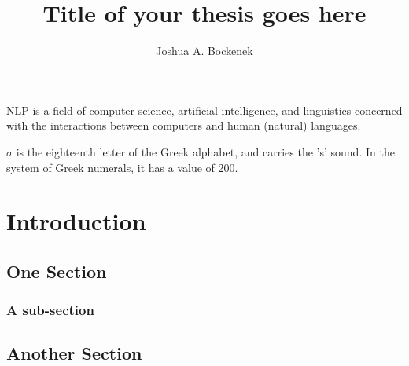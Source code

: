 \documentclass[doublespace,draft,nopageskip,prelim]{VTthesis} %
\title{Title of your thesis goes here}
\author{Joshua A. Bockenek}
\begin{document}
  \frontmatter
  \maketitle
  \tableofcontents

	\listoffigures
	\listoftables
    \printnomenclature %

NLP is a field of computer science, artificial intelligence, and linguistics concerned with the interactions between computers and human (natural) languages.


$\sigma$ is the eighteenth letter of the Greek alphabet, and carries the 's' sound. In the system of Greek numerals, it has a value of 200.


	\mainmatter

	\chapter{Introduction} \label{ch:introduction}
   			\lipsum[1]

    \section{One Section} \label{se:one_section}
			\lipsum[2]
			\subsection{A sub-section} \label{ss:this_subsection}
				\lipsum[1-4]
		\section{Another Section} \label{se:another_section}
			\lipsum[1-2]
\end{document}
